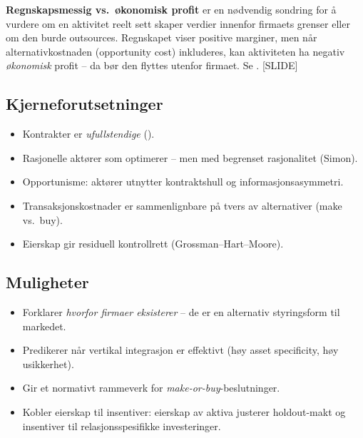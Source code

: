 \textbf{Regnskapsmessig vs.\ økonomisk profit} er en nødvendig sondring for å vurdere om en aktivitet reelt sett skaper verdier innenfor firmaets grenser eller om den burde outsources. Regnskapet viser positive marginer, men når alternativkostnaden (opportunity cost) inkluderes, kan aktiviteten ha negativ \emph{økonomisk} profit -- da bør den flyttes utenfor firmaet. Se . [SLIDE]

\subsection*{Kjerneforutsetninger}
\begin{itemize}
\item Kontrakter er \emph{ufullstendige} ().
\item Rasjonelle aktører som optimerer -- men med begrenset rasjonalitet (Simon).
\item Opportunisme: aktører utnytter kontraktshull og informasjonsasymmetri.
\item Transaksjonskostnader er sammenlignbare på tvers av alternativer (make vs.\ buy).
\item Eierskap gir residuell kontrollrett (Grossman--Hart--Moore).
\end{itemize}

\subsection*{Muligheter}
\begin{itemize}
\item Forklarer \emph{hvorfor firmaer eksisterer} -- de er en alternativ styringsform til markedet.
\item Predikerer når vertikal integrasjon er effektivt (høy asset specificity, høy usikkerhet).
\item Gir et normativt rammeverk for \emph{make-or-buy}-beslutninger.
\item Kobler eierskap til insentiver: eierskap av aktiva justerer holdout-makt og insentiver til relasjonsspesifikke investeringer.
\end{itemize}

